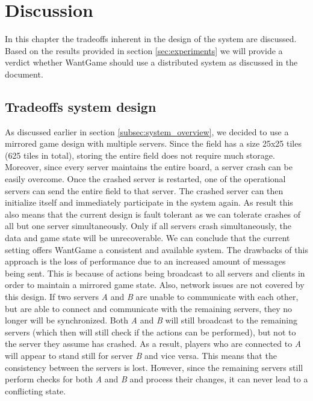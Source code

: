 \section{Discussion}


	In this chapter the tradeoffs inherent in the design of the system are discussed. Based on the results provided in section \ref{sec:experiments} we will provide a verdict whether WantGame should use a distributed system as discussed in the document.
	
	
	\subsection{Tradeoffs system design}
	\label{subsec:tradeoffs_system_design}
		As discussed earlier in section \ref{subsec:system_overview}, we decided to use a mirrored game design with multiple servers. 
		Since the field has a size 25x25 tiles (625 tiles in total), storing the entire field does not require much storage. 
		Moreover, since every server maintains the entire board, a server crash can be easily overcome.
		Once the crashed server is restarted, one of the operational servers can send the entire field to that server. 
		The crashed server can then initialize itself and immediately participate in the system again. 
		As result this also means that the current design is fault tolerant as we can tolerate crashes of all but one server simultaneously. 
		Only if all servers crash simultaneously, the data and game state will be unrecoverable.
		We can conclude that the current setting offers WantGame a consistent and available system. 
		The drawbacks of this approach is the loss of performance due to an increased amount of messages being sent. 
		This is because of actions being broadcast to all servers and clients in order to maintain a mirrored game state. 
		Also, network issues are not covered by this design. 
		If two servers \emph{A} and \emph{B} are unable to communicate with each other, but are able to connect and communicate with the remaining servers, they no longer will be synchronized. 
		Both \emph{A} and \emph{B} will still broadcast to the remaining servers (which then will still check if the actions can be performed), but not to the server they assume has crashed. 
		As a result, players who are connected to \emph{A} will appear to stand still for server \emph{B} and vice versa. This means that the consistency between the servers is lost. However, since the remaining servers still perform checks for both \emph{A} and \emph{B} and process their changes, it can never lead to a conflicting state.
	
